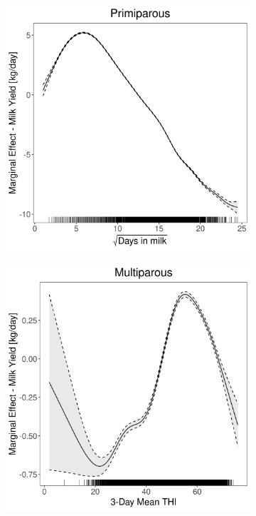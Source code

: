 \begin{figure}[H]
\begin{subfigure}[b]{0.45\textwidth}
    \end{subfigure}
    \hspace{0.05\textwidth} %
    \begin{subfigure}[b]{0.45\textwidth}
        \centering
        \includegraphics[width=\textwidth]{thesis/figures/models/milk/before2010/ho_milk_before2010/ho_milk_before2010_marginal_dim_milk_primi.png}
    \end{subfigure}
    \begin{subfigure}[b]{0.45\textwidth}
        \centering
        \includegraphics[width=\textwidth]{thesis/figures/models/milk/before2010/ho_milk_before2010/ho_milk_before2010_marginal_thi_milk_multi.png}

\end{subfigure}
\end{figure}

